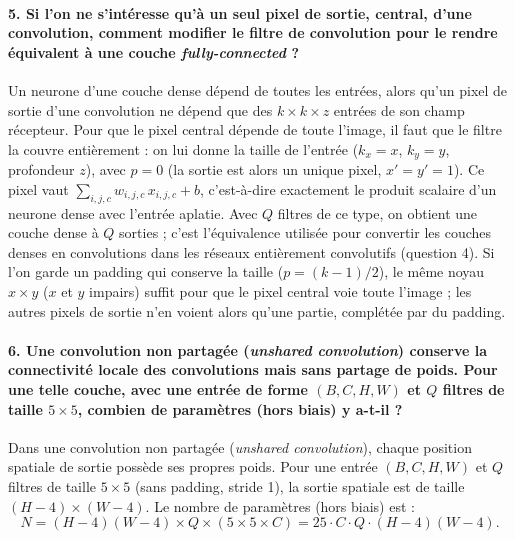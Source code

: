 \documentclass{report}
\begin{document}
\paragraph{5. Si l'on ne s'intéresse qu'à un seul pixel de sortie, central, d'une convolution, comment modifier le filtre de convolution pour le rendre équivalent à une couche \textit{fully-connected} ?}
 Un neurone d'une couche dense dépend de toutes les entrées, alors qu'un pixel de sortie d'une convolution ne dépend que des $k \times k \times z$ entrées de son champ récepteur. Pour que le pixel central dépende de toute l'image, il faut que le filtre la couvre entièrement : on lui donne la taille de l'entrée ($k_x = x$, $k_y = y$, profondeur $z$), avec $p = 0$ (la sortie est alors un unique pixel, $x' = y' = 1$). Ce pixel vaut $\sum_{i,j,c} w_{i,j,c}\, x_{i,j,c} + b$, c'est-à-dire exactement le produit scalaire d'un neurone dense avec l'entrée aplatie. Avec $Q$ filtres de ce type, on obtient une couche dense à $Q$ sorties ; c'est l'équivalence utilisée pour convertir les couches denses en convolutions dans les réseaux entièrement convolutifs (question 4). Si l'on garde un padding qui conserve la taille ($p = (k-1)/2$), le même noyau $x \times y$ ($x$ et $y$ impairs) suffit pour que le pixel central voie toute l'image ; les autres pixels de sortie n'en voient alors qu'une partie, complétée par du padding.

\paragraph{6. Une convolution non partagée (\textit{unshared convolution}) conserve la connectivité locale des convolutions mais sans partage de poids. Pour une telle couche, avec une entrée de forme $(B, C, H, W)$ et $Q$ filtres de taille $5 \times 5$, combien de paramètres (hors biais) y a-t-il ?}
 Dans une convolution non partagée (\textit{unshared convolution}), chaque position spatiale de sortie possède ses propres poids. Pour une entrée $(B, C, H, W)$ et $Q$ filtres de taille $5 \times 5$ (sans padding, stride 1), la sortie spatiale est de taille $(H-4) \times (W-4)$. Le nombre de paramètres (hors biais) est :
\begin{equation}
    N = (H - 4)(W - 4) \times Q \times (5 \times 5 \times C) = 25 \cdot C \cdot Q \cdot (H - 4)(W - 4).
\end{equation}
\end{document}
